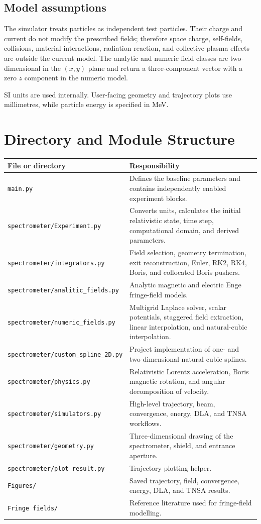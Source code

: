 \documentclass[11pt,a4paper]{report}
\newcommand{\code}[1]{\texttt{#1}}
\begin{document}
\section{Model assumptions}
The simulator treats particles as independent test particles.  Their charge
and current do not modify the prescribed fields; therefore space charge,
self-fields, collisions, material interactions, radiation reaction, and
collective plasma effects are outside the current model.  The analytic and
numeric field classes are two-dimensional in the $(x,y)$ plane and return a
three-component vector with a zero $z$ component in the numeric model.

SI units are used internally.  User-facing geometry and trajectory plots use
millimetres, while particle energy is specified in MeV.

\chapter{Directory and Module Structure}

\begin{longtable}{p{}p{}}
\toprule
File or directory & Responsibility \\
\midrule
\endhead
\code{main.py} & Defines the baseline parameters and contains independently enabled experiment blocks. \\
\code{spectrometer/Experiment.py} & Converts units, calculates the initial relativistic state, time step, computational domain, and derived parameters. \\
\code{spectrometer/integrators.py} & Field selection, geometry termination, exit reconstruction, Euler, RK2, RK4, Boris, and collocated Boris pushers. \\
\code{spectrometer/analitic\_fields.py} & Analytic magnetic and electric Enge fringe-field models. \\
\code{spectrometer/numeric\_fields.py} & Multigrid Laplace solver, scalar potentials, staggered field extraction, linear interpolation, and natural-cubic interpolation. \\
\code{spectrometer/custom\_spline\_2D.py} & Project implementation of one- and two-dimensional natural cubic splines. \\
\code{spectrometer/physics.py} & Relativistic Lorentz acceleration, Boris magnetic rotation, and angular decomposition of velocity. \\
\code{spectrometer/simulators.py} & High-level trajectory, beam, convergence, energy, DLA, and TNSA workflows. \\
\code{spectrometer/geometry.py} & Three-dimensional drawing of the spectrometer, shield, and entrance aperture. \\
\code{spectrometer/plot\_result.py} & Trajectory plotting helper. \\
\code{Figures/} & Saved trajectory, field, convergence, energy, DLA, and TNSA results. \\
\code{Fringe fields/} & Reference literature used for fringe-field modelling. \\
\bottomrule
\end{longtable}
\end{document}
